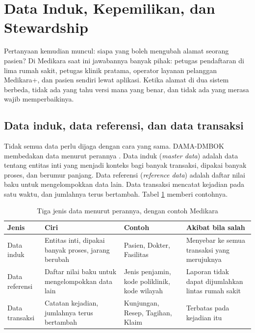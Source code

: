 \section{Data Induk, Kepemilikan, dan Stewardship}

Pertanyaan kemudian muncul: siapa yang boleh mengubah alamat seorang pasien?
Di Medikara saat ini jawabannya banyak pihak: petugas pendaftaran di lima
rumah sakit, petugas klinik pratama, operator layanan pelanggan Medikara+, dan
pasien sendiri lewat aplikasi. Ketika alamat di dua sistem berbeda, tidak ada
yang tahu versi mana yang benar, dan tidak ada yang merasa wajib
memperbaikinya.

\subsection*{Data induk, data referensi, dan data transaksi}

Tidak semua data perlu dijaga dengan cara yang sama. DAMA-DMBOK membedakan
data menurut perannya \cite{dmbok2}. Data induk (\textit{master data})
adalah data tentang entitas inti yang menjadi konteks bagi banyak transaksi,
dipakai banyak proses, dan berumur panjang. Data referensi (\textit{reference
data}) adalah daftar nilai baku untuk mengelompokkan data lain. Data transaksi
mencatat kejadian pada satu waktu, dan jumlahnya terus bertambah. Tabel
\ref{tab:ch06-jenis-data} memberi contohnya.

\begin{table}[!htb]
  \centering
  \caption{Tiga jenis data menurut perannya, dengan contoh Medikara}
  \label{tab:ch06-jenis-data}
  \begin{tabularx}{\textwidth}{lXXX}
    \hline
    \textbf{Jenis} & \textbf{Ciri} & \textbf{Contoh} & \textbf{Akibat bila salah} \\
    \hline
    Data induk & Entitas inti, dipakai banyak proses, jarang berubah &
      Pasien, Dokter, Fasilitas & Menyebar ke semua transaksi yang merujuknya \\
    \hline
    Data referensi & Daftar nilai baku untuk mengelompokkan data lain &
      Jenis penjamin, kode poliklinik, kode wilayah &
      Laporan tidak dapat dijumlahkan lintas rumah sakit \\
    \hline
    Data transaksi & Catatan kejadian, jumlahnya terus bertambah &
      Kunjungan, Resep, Tagihan, Klaim & Terbatas pada kejadian itu \\
    \hline
  \end{tabularx}
\end{table}

